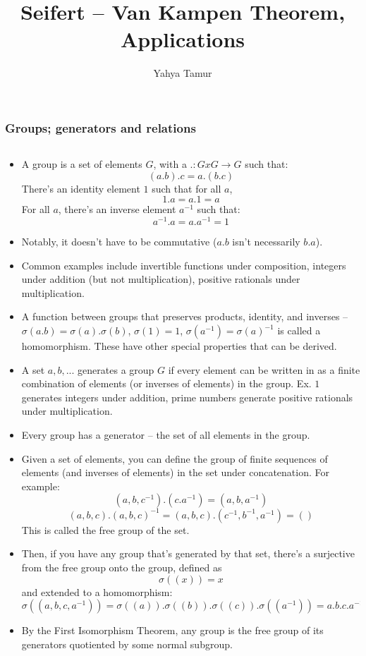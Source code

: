 \documentclass[8pt]{beamer}
\title{Seifert -- Van Kampen Theorem, Applications}
\author{Yahya Tamur}
\begin{document}
  \frame{\titlepage}
  \begin{frame}
    \frametitle{Groups; generators and relations}
    \begin{columns}
      \begin{column}[T]{0.5\textwidth}
        \begin{itemize}
          \item A group is a set of elements $G$, with a $. : GxG \rightarrow G$
            such that:
            \[(a.b).c = a.(b.c)\]
            There's an identity element $1$ such that for all $a$,
            \[1.a = a.1 = a\]
            For all $a$, there's an inverse element $a^{-1}$ such that:
            \[a^{-1}.a = a.a^{-1} = 1\]
          \item Notably, it doesn't have to be commutative ($a.b$ isn't
            necessarily $b.a$).
          \item Common examples include invertible functions under composition,
            integers under addition (but not multiplication), positive rationals
            under multiplication.
          \item A function between groups that preserves products, identity, and
            inverses -- $\sigma(a.b) = \sigma(a).\sigma(b)$, $\sigma(1) = 1$,
            $\sigma(a^{-1}) = \sigma(a)^{-1}$ is called a homomorphism. These
            have other special properties that can be derived.
          \item A set ${a,b,...}$ generates a group $G$ if every element can be
            written in as a finite combination of elements (or inverses of
            elements) in the group. Ex. ${1}$ generates integers under addition,
            prime numbers generate positive rationals under multiplication.
          \item Every group has a generator -- the set of all elements in the
            group.
          \item Given a set of elements, you can define the group of finite
            sequences of elements (and inverses of elements) in the set under
            concatenation. For example:
            \[(a,b,c^{-1}). (c.a^{-1}) = (a,b,a^{-1})\]
            \[(a,b,c).(a,b,c)^{-1} = (a,b,c).(c^{-1},b^{-1},a^{-1}) = ()\]
            This is called the free group of the set.
          \item
            Then, if you have any group that's generated by that set, there's a
            surjective from the free group onto the group, defined as
            \[\sigma((x)) = x\]
            and extended to a homomorphism:
            \[\sigma((a,b,c,a^{-1})) = \sigma((a)).\sigma((b)).\sigma((c)).
                \sigma((a^{-1})) = a.b.c.a^{-1}\]
          \item By the First Isomorphism Theorem, any group is the free group of
            its generators quotiented by some normal subgroup.


\end{itemize}
\end{column}
\end{columns}
\end{frame}
\end{document}
